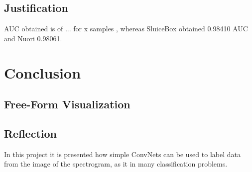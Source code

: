 \documentclass[]{article}
\begin{document}
\subsection{Justification}\label{justification}

AUC obtained is of ... for x samples , whereas SluiceBox obtained 0.98410 AUC and Nuori 0.98061.


\section{Conclusion}\label{v.-conclusion}


\subsection{Free-Form Visualization}\label{free-form-visualization}

\subsection{Reflection}\label{reflection}

In this project it is presented how simple ConvNets can be used to label data from the image of the spectrogram, as it in many classification problems.
\end{document}
